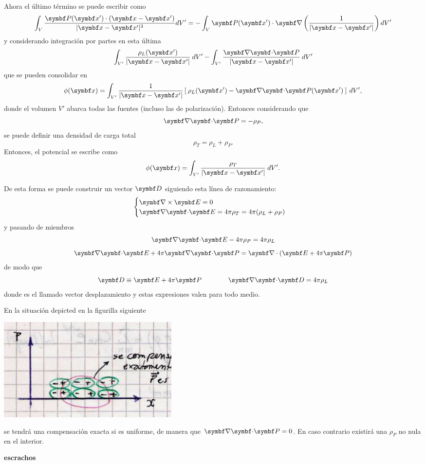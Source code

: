 \documentclass[10pt,oneside]{CBFT_book}
\begin{document}
Ahora el último término se puede escribir como
\[
	\int_V \frac{\vb{P}(\vbx')\cdot ( \vbx - \vbx')}{|\vb{x}-\vb{x}'|^3} dV' =
	-\int_V \vb{P}(\vbx')\cdot \Nabla\left( \frac{ 1 }{ |\vb{x}-\vb{x}'| } \right) dV' 
\]
y considerando integración por partes en esta última 
\[
	\int_{V'} \frac{\rho_L(\vbx')}{|\vb{x}-\vb{x}'|} \: dV' -
	\int_{V'} \frac{ \divem{P} }{|\vb{x}-\vb{x}'|} \: dV' 
\]
que se pueden consolidar en
\[
	\phi(\vbx ) = \int_{V'} \frac{1}{|\vb{x}-\vb{x}'|}
	\left[ \: \rho_L(\vbx') - \divem{P}(\vbx') \:\right] \: dV',
\]
donde el volumen $V'$ abarca todas las fuentes (incluso las de polarización). Entonces
considerando que
\[
	\divem{P} = -\rho_P,
\]
se puede definir una densidad de carga total 
\[
	\rho_T = \rho_L + \rho_P.
\]
Entonces, el potencial se escribe como
\[
	\phi(\vbx ) = \int_{V'} \frac{\rho_T}{|\vb{x}-\vb{x}'|} \: dV'.
\]

De esta forma se puede construir un vector $\vb{D}$ siguiendo
esta línea de razonamiento:
\[
	\begin{cases}
	\rotorm{E}  = 0 \\
	\divem{E} = 4\pi\rho_T = 4 \pi ( \rho_L + \rho_P )
	\end{cases}
\]
y pasando de miembros
\[
	\divem{E} -  4 \pi \rho_P = 4 \pi \rho_L 
\]
\[
	\divem{E} + 4 \pi \divem{P} = \Nabla\cdot(\vb{E} + 4\pi\vb{P} )
\]
de modo que
\[
	\vb{D} \equiv \vb{E} + 4 \pi \vb{P} \qquad \qquad \divem{D} = 4\pi\rho_L
\]
donde  es el llamado vector desplazamiento y estas expresiones valen para todo medio.

En la situación depicted en la figurilla siguiente

\includegraphics[width=0.4\textwidth]{images/fig_ft1_rhoP_nocompensada.jpg}

se tendrá una compensación exacta si  es uniforme, de manera que $\divem{P}=0$. En caso
contrario existirá una $\rho_P$ no nula en el interior.

{\bf escrachos}

\end{document}
